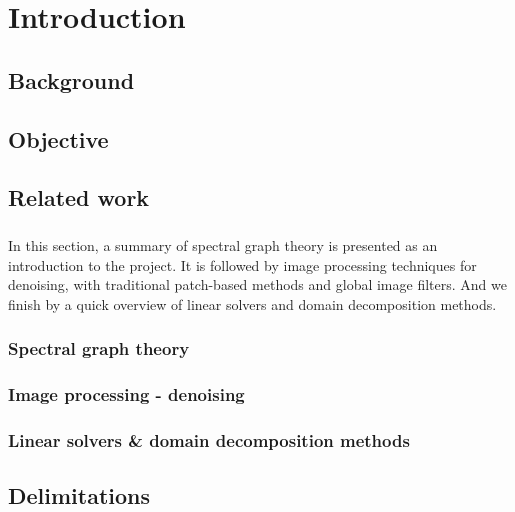 \chapter{Introduction}

\section{Background}


\section{Objective}


\section{Related work}

\paragraph{}
In this section, a summary of spectral graph theory is presented as an introduction to the project.
It is followed by image processing techniques for denoising, with traditional patch-based methods and global image filters.
And we finish by a quick overview of linear solvers and domain decomposition methods.

\subsection{Spectral graph theory}


\subsection{Image processing - denoising}


\subsection{Linear solvers \& domain decomposition methods}


\section{Delimitations}


